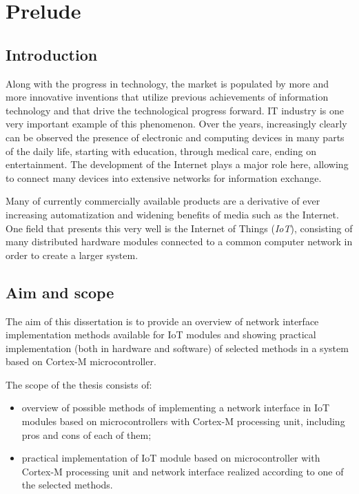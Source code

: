 \chapter{Prelude}
\section{Introduction}

Along with the progress in technology, the market is populated by more and more innovative inventions that utilize previous achievements of information technology and that drive the technological progress forward. IT industry is one very important example of this phenomenon. Over the years, increasingly clearly can be observed the presence of electronic and computing devices in many parts of the daily life, starting with education, through medical care, ending on entertainment. The development of the Internet plays a major role here, allowing to connect many devices into extensive networks for information exchange.

Many of currently commercially available products are a derivative of ever increasing automatization and widening benefits of media such as the Internet. One field that presents this very well is the Internet of Things (\emph{IoT}), consisting of many distributed hardware modules connected to a common computer network in order to create a larger system.

\section{Aim and scope}

The aim of this dissertation is to provide an overview of network interface implementation methods available for IoT modules and showing practical implementation (both in hardware and software) of selected methods in a system based on Cortex-M microcontroller.

The scope of the thesis consists of:

\begin{itemize}
	\item [$\bullet$] overview of possible methods of implementing a network interface in IoT modules based on microcontrollers with Cortex-M processing unit, including pros and cons of each of them;
	\item [$\bullet$] practical implementation of IoT module based on microcontroller with Cortex-M processing unit and network interface realized according to one of the selected methods.
\end{itemize}
